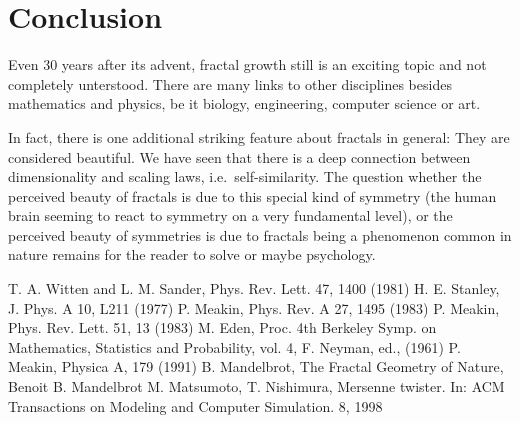 \documentclass[twocolumn, 10pt]{scrartcl}
\begin{document}
    \section{Conclusion}
        Even 30 years after its advent, fractal growth still is an exciting topic and not completely unterstood.
        There are many links to other disciplines besides mathematics and physics, be it biology, engineering,
        computer science or art.

        In fact, there is one additional striking feature about fractals in general: They are considered beautiful. We
        have seen that there is a deep connection between dimensionality and scaling laws, i.e.\ self-similarity. The
        question whether the perceived beauty of fractals is due to this special kind of symmetry (the human brain
        seeming to react to symmetry on a very fundamental level), or the perceived beauty of symmetries is due to
        fractals being a phenomenon common in nature remains for the reader to solve or maybe psychology.

    \begin{thebibliography}{99}
         T. A. Witten and L. M. Sander, Phys. Rev. Lett. 47, 1400 (1981)
         H. E. Stanley, J. Phys. A 10, L211 (1977)
         P. Meakin, Phys. Rev. A 27, 1495 (1983)
         P. Meakin, Phys. Rev. Lett. 51, 13 (1983)
         M. Eden, Proc. 4th Berkeley Symp. on Mathematics, Statistics and Probability, vol. 4,
            F. Neyman, ed., (1961)
         P. Meakin, Physica A, 179 (1991)
         B. Mandelbrot, The Fractal Geometry of Nature, Benoit B. Mandelbrot
        M. Matsumoto, T. Nishimura, Mersenne twister. In: ACM Transactions on Modeling and
          Computer Simulation. 8, 1998
    \end{thebibliography}
\end{document}

